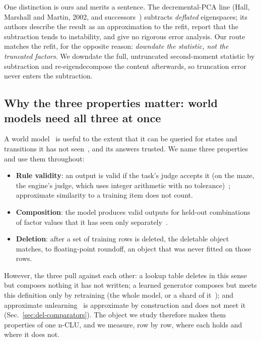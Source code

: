 \documentclass{article} %
\begin{document}
One distinction is ours and merits a sentence. The decremental-PCA
line (Hall, Marshall and Martin, 2002\nocite{hall2002adding}, and successors~\citep{jin2014evd,lee2021fast}) subtracts \emph{deflated} eigenspaces;
its authors describe the result as an approximation to the refit, report that the subtraction
tends to instability, and give no rigorous error analysis. Our route matches the refit, for the opposite reason: \emph{downdate the statistic, not the truncated factors}. We downdate the full,
untruncated second-moment statistic by subtraction and re-eigendecompose the content
afterwards, so truncation error never enters the subtraction.

\subsection{Why the three properties matter: world models need all three at once}
\label{sec:why}

A world model~\citep{ha2018world,hafner2025mastering} is useful to the extent that it can be queried for states and transitions it has
not seen~\citep{valevski2025diffusion}, and its answers trusted. We name three properties and use them throughout:
\begin{itemize}[leftmargin=*,nosep]
\item \textbf{Rule validity}: an output is valid if the task's judge accepts it (on the maze, the engine's judge, which
uses integer arithmetic with no tolerance)~\citep{vafa2024evaluating}; approximate similarity to a training item does not count.
\item \textbf{Composition}: the model produces valid outputs for held-out combinations of
  factor values that it has seen only separately~\citep{zhao2022toward}.
\item \textbf{Deletion}: after a set of training rows
is deleted, the deletable object matches, to floating-point roundoff, an object that was never fitted
on those rows.
\end{itemize}
However, the three pull against each other: a lookup table deletes in this sense but
composes nothing it has not written; a learned generator composes but meets this definition only by
retraining (the whole model, or a shard of it~\citep{bourtoule2021machine}); and approximate unlearning~\citep{guo2020certified,golatkar2020eternal} is approximate by construction and does not meet it (Sec.~\ref{sec:del-comparators}). The object we study therefore makes them properties of one n-CLU, and we measure, row by row, where each holds and where it does not.
\end{document}
